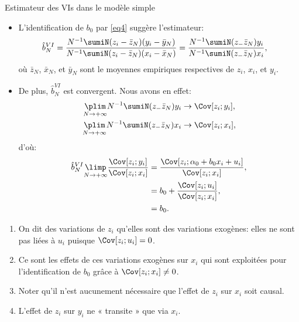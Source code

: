\begin{frame}[allowframebreaks]{Estimateur des VIs dans le modèle simple}
    \begin{itemize}
        \item L'identification de $b_0$ par \eqref{eq4} suggère l'estimateur:
        \begin{align}
            \hat{b}_N^{VI} &= \frac{N^{-1}\sumiN(z_i - \bar{z}_N)(y_i - \bar{y}_N)}{
                N^{-1}\sumiN(z_i - \bar{z}_N)(x_i - \bar{x}_N)} = 
                \frac{N^{-1}\sumiN (z_-\bar{z}_N)y_i}
                {N^{-1}\sumiN (z_-\bar{z}_N)x_i},
                \label{eq5}
        \end{align}
        où $\bar{z}_N$, $\bar{x}_N$, et  $\bar{y}_N$ sont le moyennes empiriques respectives de 
        $z_i$, $x_i$, et $y_i$. 
        \item De plus, $\hat{b}_N^{VI}$ est convergent. Nous avons en effet:
        \begin{align*}
            \underset{N\to + \infty}{\plim} N^{-1}\sumiN (z_-\bar{z}_N)y_i &\rightarrow 
            \Cov[z_i; y_i],\\
            \underset{N\to + \infty}{\plim} N^{-1}\sumiN (z_-\bar{z}_N)x_i &\rightarrow 
            \Cov[z_i; x_i],
        \end{align*}
        d'où:
        \begin{align*}
            \hat{b}_N^{VI} \underset{N\to + \infty}{\limp} 
            \frac{\Cov[z_i; y_i]}{\Cov[z_i;x_i]} &= \frac{\Cov[z_i; \alpha_0 + b_0x_i + u_i]}{\Cov[z_i;x_i]},\\
            &= b_0 + \frac{\Cov[z_i;u_i]}{\Cov[z_i;x_i]},\\
            &=b_0.
        \end{align*}
    \end{itemize}
    \framebreak
    \begin{remark_fr}
        \begin{enumerate}[$\star$]
            \item On dit des variations de $z_i$ qu’elles sont des variations exogènes: 
            elles ne sont pas liées à $u_i$ puisque $\Cov[z_i;u_i]=0$.
            \item Ce sont les effets de ces variations exogènes sur $x_i$ qui sont exploitées pour 
            l’identification de $b_0$ grâce à $\Cov[z_i;x_i]\neq 0$.
            \item Noter qu’il n’est aucunement nécessaire que l’effet de $z_i$ sur $x_i$ soit causal. 
            \item L’effet de $z_i$ sur $y_i$ ne « transite » que via $x_i$. 

\end{enumerate}
\end{remark_fr}
\end{frame}
